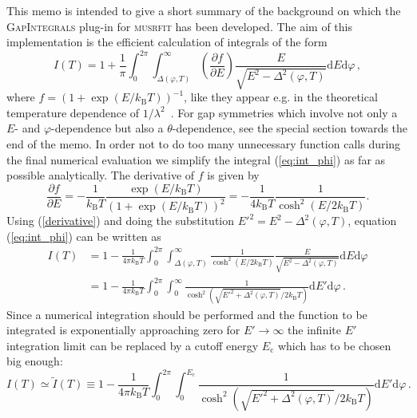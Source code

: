 \documentclass[twoside]{article}
\newcommand{\musrfit}{\textsc{musrfit}\xspace}
\newcommand{\gapint}{\textsc{GapIntegrals}\xspace}
\begin{document}
This memo is intended to give a short summary of the background on which the \gapint plug-in for \musrfit \cite{musrfit} has been developed. The aim of this implementation is the efficient calculation of integrals of the form
\begin{equation}\label{eq:int_phi}
 I(T) = 1 + \frac{1}{\pi}\int_0^{2\pi}\int_{\Delta(\varphi,T)}^{\infty}\left(\frac{\partial f}{\partial E}\right) \frac{E}{\sqrt{E^2-\Delta^2(\varphi,T)}}\mathrm{d}E\mathrm{d}\varphi\,,
\end{equation}
where $f = (1+\exp(E/k_{\mathrm B}T))^{-1}$, like they appear e.g. in the theoretical temperature dependence of $1/\lambda^2$~\cite{Manzano}.
For gap symmetries which involve not only a $E$- and $\varphi$-dependence but also a $\theta$-dependence, see the special section towards the end of the memo.
In order not to do too many unnecessary function calls during the final numerical evaluation we simplify the integral (\ref{eq:int_phi}) as far as possible analytically. The derivative of $f$ is given by
\begin{equation}\label{derivative}
\frac{\partial f}{\partial E} = -\frac{1}{k_{\mathrm B}T}\frac{\exp(E/k_{\mathrm B}T)}{\left(1+\exp(E/k_{\mathrm B}T)\right)^2} = -\frac{1}{4k_{\mathrm B}T} \frac{1}{\cosh^2\left(E/2k_{\mathrm B}T\right)}.
\end{equation}
Using (\ref{derivative}) and doing the substitution $E'^2 = E^2-\Delta^2(\varphi,T)$, equation (\ref{eq:int_phi}) can be written as
\begin{equation}\label{eq:bmw_2d}
\begin{split}
I(T) & = 1 - \frac{1}{4\pi k_{\mathrm B}T}\int_0^{2\pi}\int_{\Delta(\varphi,T)}^{\infty}\frac{1}{\cosh^2\left(E/2k_{\mathrm B}T\right)}\frac{E}{\sqrt{E^2-\Delta^2(\varphi,T)}}\mathrm{d}E\mathrm{d}\varphi \\
& = 1 - \frac{1}{4\pi k_{\mathrm B}T}\int_0^{2\pi}\int_{0}^{\infty}\frac{1}{\cosh^2\left(\sqrt{E'^2+\Delta^2(\varphi,T)}/2k_{\mathrm B}T\right)}\mathrm{d}E'\mathrm{d}\varphi\,.
\end{split}
\end{equation}
Since a numerical integration should be performed and the function to be integrated is exponentially approaching zero for $E'\rightarrow\infty$ the infinite $E'$ integration limit can be replaced by a cutoff energy $E_{\mathrm c}$ which has to be chosen big enough:
\begin{equation}
I(T) \simeq \tilde{I}(T) \equiv 1 - \frac{1}{4\pi k_{\mathrm B}T}\int_0^{2\pi}\int_{0}^{E_{\mathrm c}}\frac{1}{\cosh^2\left(\sqrt{E'^2+\Delta^2(\varphi,T)}/2k_{\mathrm B}T\right)}\mathrm{d}E'\mathrm{d}\varphi\,.
\end{equation}
\end{document}
